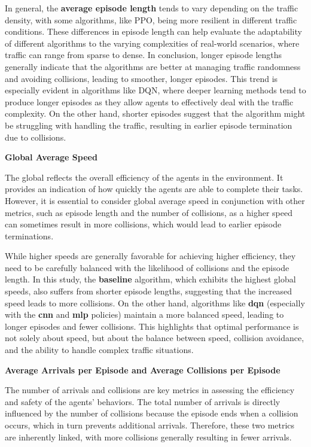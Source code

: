 In general, the \textbf{average episode length} tends to vary depending on the traffic density, with some algorithms, like PPO, being more resilient in different traffic conditions. These differences in episode length can help evaluate the adaptability of different algorithms to the varying complexities of real-world scenarios, where traffic can range from sparse to dense.
In conclusion, longer episode lengths generally indicate that the algorithms are better at managing traffic randomness and avoiding collisions, leading to smoother, longer episodes. This trend is especially evident in algorithms like DQN, where deeper learning methods tend to produce longer episodes as they allow agents to effectively deal with the traffic complexity. On the other hand, shorter episodes suggest that the algorithm might be struggling with handling the traffic, resulting in earlier episode termination due to collisions.

\textbf{Global Average Speed}

The global reflects the overall efficiency of the agents in the environment. 
It provides an indication of how quickly the agents are able to complete their tasks. 
However, it is essential to consider global average speed in conjunction with other metrics, such as episode length and the number of collisions, 
as a higher speed can sometimes result in more collisions, which would lead to earlier episode terminations.

While higher speeds are generally favorable for achieving higher efficiency, they need to be carefully balanced with the likelihood of collisions and the episode length. 
In this study, the \textbf{baseline} algorithm, which exhibits the highest global speeds, also suffers from shorter episode lengths, suggesting that the increased speed leads to more collisions. 
On the other hand, algorithms like \textbf{dqn} (especially with the \textbf{cnn} and \textbf{mlp} policies) maintain a more balanced speed, leading to longer episodes and fewer collisions. 
This highlights that optimal performance is not solely about speed, but about the balance between speed, collision avoidance, and the ability to handle complex traffic situations.

\textbf{Average Arrivals per Episode and Average Collisions per Episode}

The number of arrivals and collisions are key metrics in assessing the efficiency and safety of the agents' behaviors. 
The total number of arrivals is directly influenced by the number of collisions because the episode ends when a collision occurs, 
which in turn prevents additional arrivals. 
Therefore, these two metrics are inherently linked, with more collisions generally resulting in fewer arrivals.

